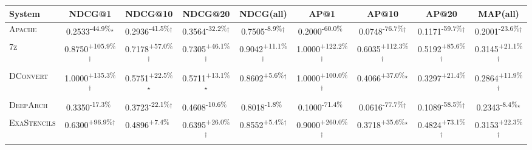 \begin{table}[htbp]
\centering
\renewcommand{\arraystretch}{1.2}
\begin{tabular}{l|cccc|cccc}
\hline
System & NDCG@1 & NDCG@10 & NDCG@20 & NDCG(all) & AP@1 & AP@10 & AP@20 & MAP(all) \\ \hline
\textsc{Apache} & \cellcolor{red!30}0.2533\textsuperscript{-44.9\%}$^\star$ & \cellcolor{red!30}0.2936\textsuperscript{-41.5\%}$^\dagger$ & \cellcolor{red!30}0.3564\textsuperscript{-32.2\%}$^\dagger$ & \cellcolor{red!30}0.7505\textsuperscript{-8.9\%}$^\dagger$ & \cellcolor{red!30}0.2000\textsuperscript{-60.0\%}$^{\,\,\,}$ & \cellcolor{red!30}0.0748\textsuperscript{-76.7\%}$^\dagger$ & \cellcolor{red!30}0.1171\textsuperscript{-59.7\%}$^\dagger$ & \cellcolor{red!30}0.2001\textsuperscript{-23.6\%}$^\dagger$ \\
\textsc{7z} & \cellcolor{green!30}0.8750\textsuperscript{+105.9\%}$^\dagger$ & \cellcolor{green!30}0.7178\textsuperscript{+57.0\%}$^\dagger$ & \cellcolor{green!30}0.7305\textsuperscript{+46.1\%}$^\dagger$ & \cellcolor{green!30}0.9042\textsuperscript{+11.1\%}$^\dagger$ & \cellcolor{green!30}1.0000\textsuperscript{+122.2\%}$^\dagger$ & \cellcolor{green!30}0.6035\textsuperscript{+112.3\%}$^\dagger$ & \cellcolor{green!30}0.5192\textsuperscript{+85.6\%}$^\dagger$ & \cellcolor{green!30}0.3145\textsuperscript{+21.1\%}$^\dagger$ \\
\textsc{DConvert} & \cellcolor{green!30}1.0000\textsuperscript{+135.3\%}$^\dagger$ & \cellcolor{green!30}0.5751\textsuperscript{+22.5\%}$^\star$ & \cellcolor{green!30}0.5711\textsuperscript{+13.1\%}$^\star$ & \cellcolor{green!30}0.8602\textsuperscript{+5.6\%}$^\dagger$ & \cellcolor{green!30}1.0000\textsuperscript{+100.0\%}$^\dagger$ & \cellcolor{green!30}0.4066\textsuperscript{+37.0\%}$^\star$ & \cellcolor{green!30}0.3297\textsuperscript{+21.4\%}$^{\,\,\,}$ & \cellcolor{green!30}0.2864\textsuperscript{+11.9\%}$^\dagger$ \\
\textsc{DeepArch} & \cellcolor{red!30}0.3350\textsuperscript{-17.3\%}$^{\,\,\,}$ & \cellcolor{red!30}0.3723\textsuperscript{-22.1\%}$^\dagger$ & \cellcolor{red!30}0.4608\textsuperscript{-10.6\%}$^{\,\,\,}$ & \cellcolor{red!30}0.8018\textsuperscript{-1.8\%}$^{\,\,\,}$ & \cellcolor{red!30}0.1000\textsuperscript{-71.4\%}$^{\,\,\,}$ & \cellcolor{red!30}0.0616\textsuperscript{-77.7\%}$^\dagger$ & \cellcolor{red!30}0.1089\textsuperscript{-58.5\%}$^\dagger$ & \cellcolor{red!30}0.2343\textsuperscript{-8.4\%}$^\star$ \\
\textsc{ExaStencils} & \cellcolor{green!30}0.6300\textsuperscript{+96.9\%}$^\dagger$ & \cellcolor{green!30}0.4896\textsuperscript{+7.4\%}$^{\,\,\,}$ & \cellcolor{green!30}0.6395\textsuperscript{+26.0\%}$^\dagger$ & \cellcolor{green!30}0.8552\textsuperscript{+5.4\%}$^\dagger$ & \cellcolor{green!30}0.9000\textsuperscript{+260.0\%}$^\dagger$ & \cellcolor{green!30}0.3718\textsuperscript{+35.6\%}$^\star$ & \cellcolor{green!30}0.4824\textsuperscript{+73.1\%}$^\dagger$ & \cellcolor{green!30}0.3153\textsuperscript{+22.3\%}$^\dagger$ \\

\end{tabular}
\end{table}
